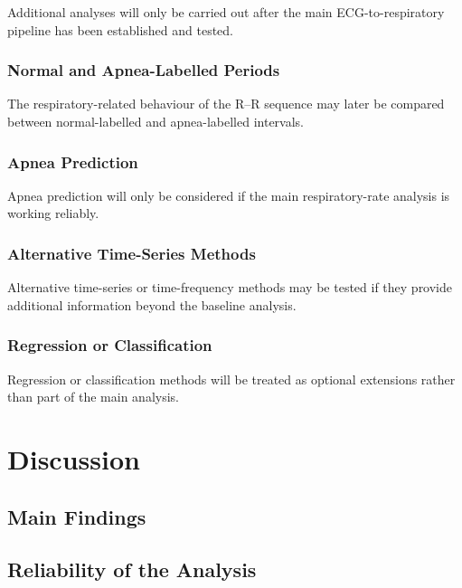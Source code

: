 \documentclass[a4paper,10.5pt,oneside]{report}
\begin{document}
Additional analyses will only be carried out after the main ECG-to-respiratory
pipeline has been established and tested.

\subsection{Normal and Apnea-Labelled Periods}

The respiratory-related behaviour of the R--R sequence may later be compared
between normal-labelled and apnea-labelled intervals.

\subsection{Apnea Prediction}

Apnea prediction will only be considered if the main respiratory-rate analysis
is working reliably.

\subsection{Alternative Time-Series Methods}

Alternative time-series or time-frequency methods may be tested if they provide
additional information beyond the baseline analysis.

\subsection{Regression or Classification}

Regression or classification methods will be treated as optional extensions
rather than part of the main analysis.
\chapter{Discussion}

\section{Main Findings}


\section{Reliability of the Analysis}

\end{document}
